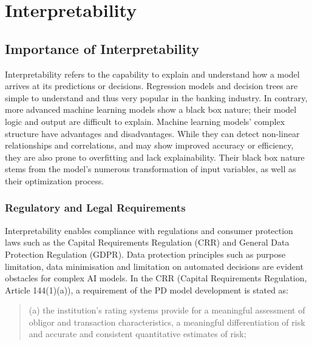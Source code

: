 \chapter{Interpretability}
\label{sec:interpret}

\section{Importance of Interpretability}
Interpretability refers to the capability to explain and understand how a model arrives at its predictions or decisions. Regression models and decision trees are simple to understand and thus very popular in the banking industry. In contrary, more advanced machine learning models show a black box nature; their model logic and output are difficult to explain. Machine learning models' complex structure have advantages and disadvantages. While they can detect non-linear relationships and correlations, and may show improved accuracy or efficiency, they are also prone to overfitting and lack explainability. Their black box nature stems from the model's numerous transformation of input variables, as well as their optimization process. \cite[p.~56]{Roberts2022}

\subsection{Regulatory and Legal Requirements}
\label{sec:ref_leg}

Interpretability enables compliance with regulations and consumer protection laws such as the Capital Requirements Regulation (CRR) and General Data Protection Regulation (GDPR). Data protection principles such as purpose limitation, data minimisation and limitation on automated decisions are evident obstacles for complex AI models. In the CRR (Capital Requirements Regulation, Article 144(1)(a)), a requirement of the PD model development is stated as:

\begin{quote}

(a) the institution's rating systems provide for a meaningful assessment of obligor and transaction characteristics, a meaningful differentiation of risk and accurate and consistent quantitative estimates of risk;

\end{quote}

